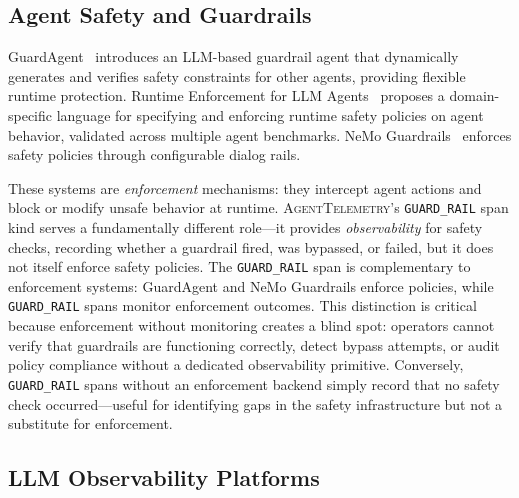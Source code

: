 \documentclass[sigplan,10pt,screen]{acmart}
\begin{document}
\subsection{Agent Safety and Guardrails}

GuardAgent~\cite{guardagent} introduces an LLM-based guardrail agent
that dynamically generates and verifies safety constraints for other
agents, providing flexible runtime protection.
Runtime Enforcement for LLM Agents~\cite{runtime_enforcement} proposes
a domain-specific language for specifying and enforcing runtime safety
policies on agent behavior, validated across multiple agent benchmarks.
NeMo Guardrails~\cite{nemo_guardrails} enforces safety policies
through configurable dialog rails.

These systems are \emph{enforcement} mechanisms: they intercept agent
actions and block or modify unsafe behavior at runtime.
\textsc{AgentTelemetry}'s \texttt{GUARD\_RAIL} span kind serves a
fundamentally different role---it provides \emph{observability} for
safety checks, recording whether a guardrail fired, was bypassed, or
failed, but it does not itself enforce safety policies.  The
\texttt{GUARD\_RAIL} span is complementary to enforcement systems:
GuardAgent and NeMo Guardrails enforce policies, while
\texttt{GUARD\_RAIL} spans monitor enforcement outcomes.  This
distinction is critical because enforcement without monitoring creates
a blind spot: operators cannot verify that guardrails are functioning
correctly, detect bypass attempts, or audit policy compliance without
a dedicated observability primitive.  Conversely,
\texttt{GUARD\_RAIL} spans without an enforcement backend simply
record that no safety check occurred---useful for identifying gaps in
the safety infrastructure but not a substitute for enforcement.

\subsection{LLM Observability Platforms}
\end{document}
